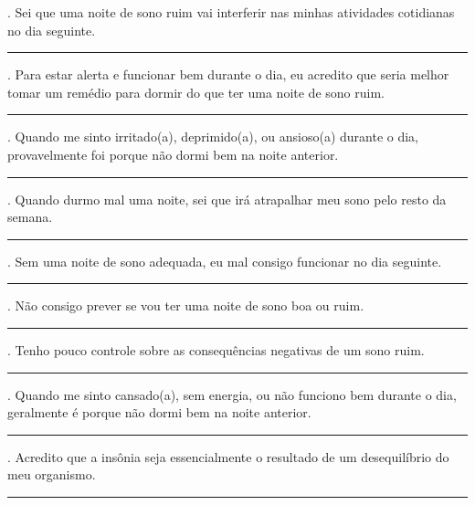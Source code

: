 \documentclass[
  ,doc,11pt, twoside,floatsintext]{apa6}
\begin{document}
\begin{appendix}
\begin{flushleft}
{. Sei que uma noite de sono ruim vai interferir nas minhas atividades cotidianas no dia seguinte.
\medskip
\hrule
\medskip
\hspace*{6mm} \par

. Para estar alerta e funcionar bem durante o dia, eu acredito que seria melhor tomar um remédio para dormir do que ter uma noite de sono ruim.
\medskip
\hrule
\medskip
\hspace*{6mm} \par

. Quando me sinto irritado(a), deprimido(a), ou ansioso(a) durante o dia, provavelmente foi porque não dormi bem na noite anterior. 
\medskip
\hrule
\medskip
\hspace*{6mm} \par

. Quando durmo mal uma noite, sei que irá atrapalhar meu sono pelo resto da semana. 
\medskip
\hrule
\medskip
\hspace*{6mm} \par

.	Sem uma noite de sono adequada, eu mal consigo funcionar no dia seguinte. 
\medskip
\hrule
\medskip
\hspace*{6mm} \par

.	Não consigo prever se vou ter uma noite de sono boa ou ruim. 
\medskip
\hrule
\medskip
\hspace*{6mm} \par

.	Tenho pouco controle sobre as consequências negativas de um sono ruim. 
\medskip
\hrule
\medskip
\hspace*{6mm} \par

.	Quando me sinto cansado(a), sem energia, ou não funciono bem durante o dia, geralmente é porque não dormi bem na noite anterior. 
\medskip
\hrule
\medskip
\hspace*{6mm} \par

.	Acredito que a insônia seja essencialmente o resultado de um desequilíbrio do meu organismo. 
\medskip
\hrule
\medskip
\hspace*{6mm} \par

}
\end{flushleft}
\end{appendix}
\end{document}
